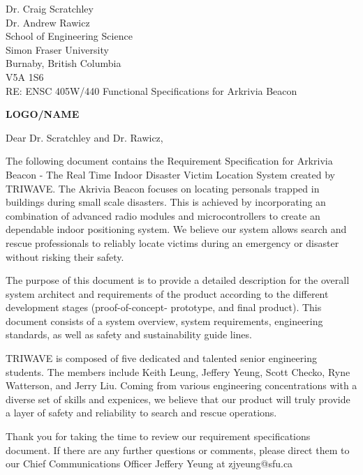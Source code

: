 \documentclass[11pt]{letter}
\date{June 09, 2019}
\begin{document}
\begin{letter}{
Dr. Craig Scratchley\\
Dr. Andrew Rawicz\\
School of Engineering Science\\
Simon Fraser University\\
Burnaby, British Columbia\\
V5A 1S6\\
\bigskip
RE: ENSC 405W/440 Functional Specifications for Arkrivia Beacon\\
} 


\begin{center}
	
\Huge\bf LOGO/NAME

\bigskip
\end{center}


\opening{Dear Dr. Scratchley and Dr. Rawicz,} 
 
\medskip
The following document contains the Requirement Specification for Arkrivia Beacon - The Real Time Indoor Disaster Victim Location System created by TRIWAVE. The Akrivia Beacon focuses on locating personals trapped in buildings during small scale disasters. This is achieved by incorporating an combination of advanced radio modules and microcontrollers to create an dependable indoor positioning system. We believe our system allows search and rescue professionals to reliably locate victims during an emergency or disaster without risking their safety.

\medskip
The purpose of this document is to provide a detailed description for the overall system architect and requirements of the product according to the different development stages (proof-of-concept- prototype, and final product). This document consists of a system overview, system requirements, engineering standards, as well as safety and sustainability guide lines.

\medskip
TRIWAVE is composed of five dedicated and talented senior engineering students. The members include Keith Leung, Jeffery Yeung, Scott Checko, Ryne Watterson, and Jerry Liu. Coming
from various engineering concentrations with a diverse set of skills and expenices, we believe that our product will truly provide a layer of safety and reliability to search and rescue operations.

\medskip
Thank you for taking the time to review our requirement specifications document. If there are any further questions or comments, please direct them to our Chief Communications Officer Jeffery Yeung at zjyeung@sfu.ca


\end{letter}
\end{document}
